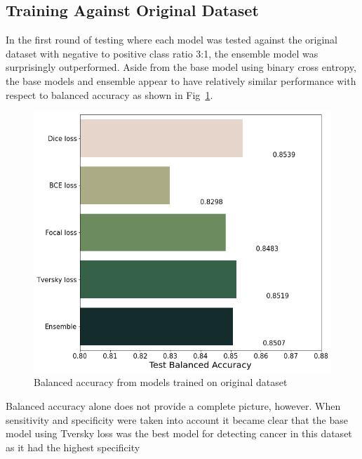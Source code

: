 \documentclass[conference]{IEEEtran}
\begin{document}
\subsection{Training Against Original Dataset}
In the first round of testing where each model was tested against the original
dataset with negative to positive class ratio 3:1, the ensemble model was
surprisingly outperformed.  Aside from the base model using binary cross
entropy, the base models and ensemble appear to have relatively similar
performance with respect to balanced accuracy as shown in Fig~\ref{original_data_balanced_accuracy}.
\begin{figure}[bp]
  \centering
  \includegraphics[scale=0.2]{original_data_balanced_accuracy.png}
  \caption{Balanced accuracy from models trained on original dataset}
  \label{original_data_balanced_accuracy}
\end{figure}
Balanced accuracy alone does not provide a complete picture, however.  When
sensitivity and specificity were taken into account it became clear that the
base model using Tversky loss was the best model for detecting cancer in this
dataset as it had the highest specificity
\end{document}
